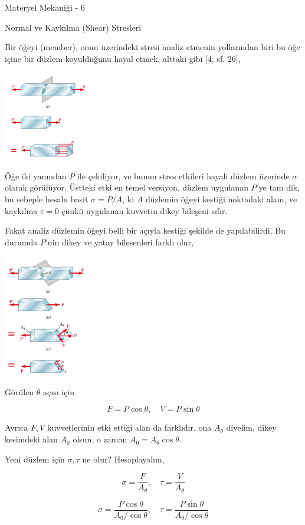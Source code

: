 \documentclass[12pt,fleqn]{article}\usepackage{../../common}
\begin{document}
Materyel Mekaniği - 6

Normal ve Kaykılma (Shear) Stresleri

Bir öğeyi (member), onun üzerindeki stresi analiz etmenin yollarından
biri bu öğe içine bir düzlem koyulduğunu hayal etmek, alttaki gibi [4, sf. 26],

\includegraphics[width=10em]{phy_020_strs_06_05.jpg}

Öğe iki yanından $P$ ile çekiliyor, ve bunun stres etkileri hayali düzlem
üzerinde $\sigma$ olarak görülüyor. Üstteki etki en temel versiyon, düzlem
uygulanan $P$'ye tam dik, bu sebeple hesabı basit $\sigma = P / A$, ki $A$
düzlemin öğeyi kestiği noktadaki alanı, ve kaykılma $\tau = 0$ çünkü uygulanan
kuvvetin dikey bileşeni sıfır.

Fakat analiz düzlemin öğeyi belli bir açıyla kestiği şekilde de yapılabilirdi.
Bu durumda $P$'nin dikey ve yatay bilesenleri farklı olur, 

\includegraphics[width=10em]{phy_020_strs_06_06.jpg}

Görülen $\theta$ açısı için

$$
F = P \cos \theta, \quad V = P \sin \theta
$$

Ayrıca $F,V$ kuvvetlerinin etki ettiği alan da farklıdır, ona $A_\theta$
diyelim, dikey kesimdeki alan $A_0$ olsun, o zaman $A_0 = A_\theta \cos \theta$.

Yeni düzlem için $\sigma,\tau$ ne olur? Hesaplayalım,

$$
\sigma = \frac{F}{A_\theta}, \quad \tau = \frac{V}{A_\theta}
$$

$$
\sigma = \frac{P \cos \theta}{A_0 / \cos\theta}, \quad
\tau = \frac{P \sin \theta}{A_0 / \cos\theta}
$$
\end{document}
